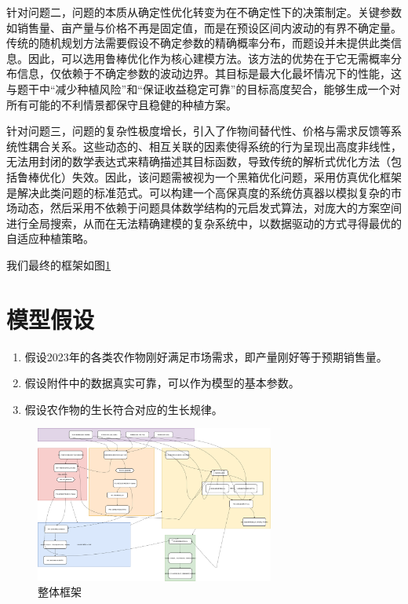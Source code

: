 \documentclass[withoutpreface,bwprint]{cumcmthesis} %
\begin{document}
针对问题二，问题的本质从确定性优化转变为在不确定性下的决策制定。关键参数如销售量、亩产量与价格不再是固定值，而是在预设区间内波动的有界不确定量。传统的随机规划方法需要假设不确定参数的精确概率分布，而题设并未提供此类信息。因此，可以选用鲁棒优化作为核心建模方法。该方法的优势在于它无需概率分布信息，仅依赖于不确定参数的波动边界。其目标是最大化最坏情况下的性能，这与题干中“减少种植风险”和“保证收益稳定可靠”的目标高度契合，能够生成一个对所有可能的不利情景都保守且稳健的种植方案。

针对问题三，问题的复杂性极度增长，引入了作物间替代性、价格与需求反馈等系统性耦合关系。这些动态的、相互关联的因素使得系统的行为呈现出高度非线性，无法用封闭的数学表达式来精确描述其目标函数，导致传统的解析式优化方法（包括鲁棒优化）失效。因此，该问题需被视为一个黑箱优化问题，采用仿真优化框架是解决此类问题的标准范式。可以构建一个高保真度的系统仿真器以模拟复杂的市场动态，然后采用不依赖于问题具体数学结构的元启发式算法，对庞大的方案空间进行全局搜索，从而在无法精确建模的复杂系统中，以数据驱动的方式寻得最优的自适应种植策略。

我们最终的框架如图\ref{fig:all}







\section{模型假设}

\begin{enumerate}
	\item 假设2023年的各类农作物刚好满足市场需求，即产量刚好等于预期销售量。
	\item 假设附件中的数据真实可靠，可以作为模型的基本参数。
	\item 假设农作物的生长符合对应的生长规律。
\end{enumerate}


\begin{figure}[htbp]
    \centering
    \includegraphics[width=0.7\textwidth]{figures/all.png}
    \caption{整体框架}
    \label{fig:all}
\end{figure}
\end{document}
